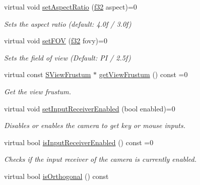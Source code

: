 \begin{DoxyCompactItemize}
virtual void \hyperlink{classirr_1_1scene_1_1ICameraSceneNode_a5c3728a61a208376b9df6a701f4a5b3c}{set\+Aspect\+Ratio} (\hyperlink{namespaceirr_a0277be98d67dc26ff93b1a6a1d086b07}{f32} aspect)=0
\begin{DoxyCompactList}\small\item\em Sets the aspect ratio (default\+: 4.\+0f / 3.\+0f) \end{DoxyCompactList}\item 
virtual void \hyperlink{classirr_1_1scene_1_1ICameraSceneNode_a43ee11523e9cf842d4b5d8c6a572241c}{set\+F\+OV} (\hyperlink{namespaceirr_a0277be98d67dc26ff93b1a6a1d086b07}{f32} fovy)=0
\begin{DoxyCompactList}\small\item\em Sets the field of view (Default\+: PI / 2.\+5f) \end{DoxyCompactList}\item 
virtual const \hyperlink{structirr_1_1scene_1_1SViewFrustum}{S\+View\+Frustum} $\ast$ \hyperlink{classirr_1_1scene_1_1ICameraSceneNode_add0cba097d3e59714546f04f2c53477e}{get\+View\+Frustum} () const =0
\begin{DoxyCompactList}\small\item\em Get the view frustum. \end{DoxyCompactList}\item 
virtual void \hyperlink{classirr_1_1scene_1_1ICameraSceneNode_a5b5c89233c1805676d6fcb392236dfec}{set\+Input\+Receiver\+Enabled} (bool enabled)=0
\begin{DoxyCompactList}\small\item\em Disables or enables the camera to get key or mouse inputs. \end{DoxyCompactList}\item 
\mbox{\label{classirr_1_1scene_1_1ICameraSceneNode_a15eeaf8a5c69af91d920b8243f76796f}} 
virtual bool \hyperlink{classirr_1_1scene_1_1ICameraSceneNode_a15eeaf8a5c69af91d920b8243f76796f}{is\+Input\+Receiver\+Enabled} () const =0
\begin{DoxyCompactList}\small\item\em Checks if the input receiver of the camera is currently enabled. \end{DoxyCompactList}\item 
\mbox{\label{classirr_1_1scene_1_1ICameraSceneNode_a5cfd588d836004923f01667543837d6c}} 
virtual bool \hyperlink{classirr_1_1scene_1_1ICameraSceneNode_a5cfd588d836004923f01667543837d6c}{is\+Orthogonal} () const

\end{DoxyCompactItemize}
